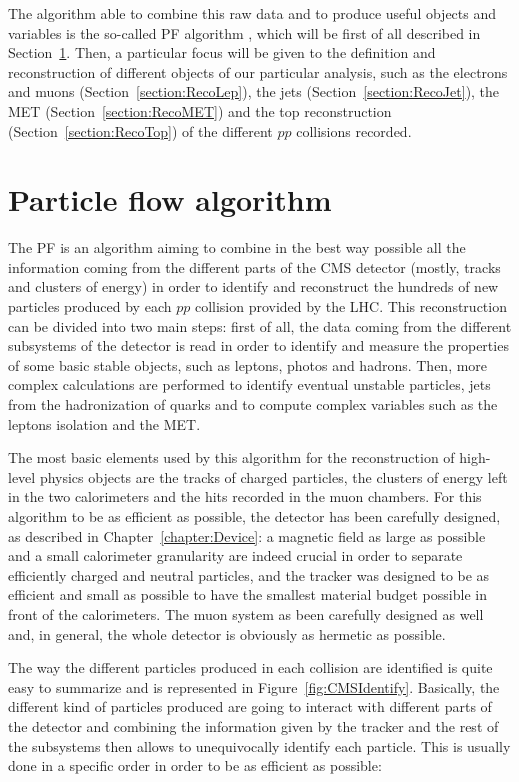 \documentclass[a4paper, 10pt, openright]{report}
\begin{document}
The algorithm able to combine this raw data and to produce useful objects and variables is the so-called \acf{PF} algorithm \cite{PF}, which will be first of all described in Section~\ref{section:PF}. Then, a particular focus will be given to the definition and reconstruction of different objects of our particular analysis, such as the electrons and muons (Section~\ref{section:RecoLep}), the jets (Section~\ref{section:RecoJet}), the \ac{MET} (Section~\ref{section:RecoMET}) and the top reconstruction (Section~\ref{section:RecoTop}) of the different $pp$ collisions recorded.

\section{Particle flow algorithm} \label{section:PF}

The \ac{PF} is an algorithm aiming to combine in the best way possible all the information coming from the different parts of the \ac{CMS} detector (mostly, tracks and clusters of energy) in order to identify and reconstruct the hundreds of new particles produced by each $pp$ collision provided by the \ac{LHC}. This reconstruction can be divided into two main steps: first of all, the data coming from the different subsystems of the detector is read in order to identify and measure the properties of some basic stable objects, such as leptons, photos and hadrons. Then, more complex calculations are performed to identify eventual unstable particles, jets from the hadronization of quarks and to compute complex variables such as the leptons isolation and the \ac{MET}.

The most basic elements used by this algorithm for the reconstruction of high-level physics objects are the tracks of charged particles, the clusters of energy left in the two calorimeters and the hits recorded in the muon chambers. For this algorithm to be as efficient as possible, the detector has been carefully designed, as described in Chapter~\ref{chapter:Device}: a magnetic field as large as possible and a small calorimeter granularity are indeed crucial in order to separate efficiently charged and neutral particles, and the tracker was designed to be as efficient and small as possible to have the smallest material budget possible in front of the calorimeters. The muon system as been carefully designed as well and, in general, the whole detector is obviously as hermetic as possible.

The way the different particles produced in each collision are identified is quite easy to summarize and is represented in Figure~\ref{fig:CMSIdentify}. Basically, the different kind of particles produced are going to interact with different parts of the detector and combining the information given by the tracker and the rest of the subsystems then allows to unequivocally identify each particle. This is usually done in a specific order in order to be as efficient as possible:
\end{document}

